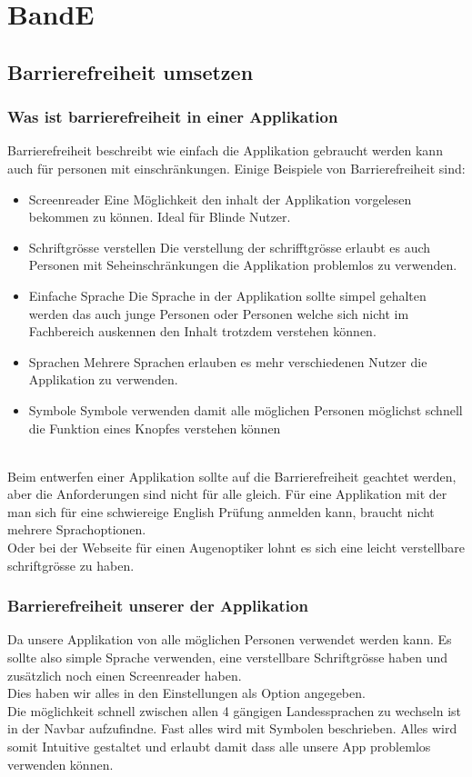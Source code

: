 \documentclass[10pt]{article}
\begin{document}
	\section{BandE}
	\subsection{Barrierefreiheit umsetzen}
	\subsubsection{Was ist barrierefreiheit in einer Applikation}
	Barrierefreiheit beschreibt wie einfach die Applikation gebraucht werden kann auch für personen mit einschränkungen.
	Einige Beispiele von Barrierefreiheit sind:
	\begin{itemize}
		\item Screenreader
		Eine Möglichkeit den inhalt der Applikation vorgelesen bekommen zu können. Ideal für Blinde Nutzer.
		\item Schriftgrösse verstellen
		Die verstellung der schrifftgrösse erlaubt es auch Personen mit Seheinschränkungen die Applikation problemlos zu verwenden.
		\item Einfache Sprache
		Die Sprache in der Applikation sollte simpel gehalten werden das auch junge Personen oder Personen welche sich nicht im Fachbereich auskennen den Inhalt trotzdem verstehen können.
		\item Sprachen
		Mehrere Sprachen erlauben es mehr verschiedenen Nutzer die Applikation zu verwenden.
		\item Symbole
		Symbole verwenden damit alle möglichen Personen möglichst schnell die Funktion eines Knopfes verstehen können\\\\
	\end{itemize}

	Beim entwerfen einer Applikation sollte auf die Barrierefreiheit geachtet werden, aber die Anforderungen sind nicht für alle gleich. Für eine Applikation mit der man sich für eine schwiereige English Prüfung anmelden kann, braucht nicht mehrere Sprachoptionen.\\
	Oder bei der Webseite für einen Augenoptiker lohnt es sich eine leicht verstellbare schriftgrösse zu haben.
	\subsubsection{Barrierefreiheit unserer der Applikation}
	Da unsere Applikation von alle möglichen Personen verwendet werden kann. Es sollte also simple Sprache verwenden, eine verstellbare Schriftgrösse haben und zusätzlich noch einen Screenreader haben.\\ Dies haben wir alles in den Einstellungen als Option angegeben.\\
	Die möglichkeit schnell zwischen allen 4 gängigen Landessprachen zu wechseln ist in der Navbar aufzufindne.
	Fast alles wird mit Symbolen beschrieben. Alles wird somit Intuitive gestaltet und erlaubt damit dass alle unsere App problemlos verwenden können.
	
\end{document}
